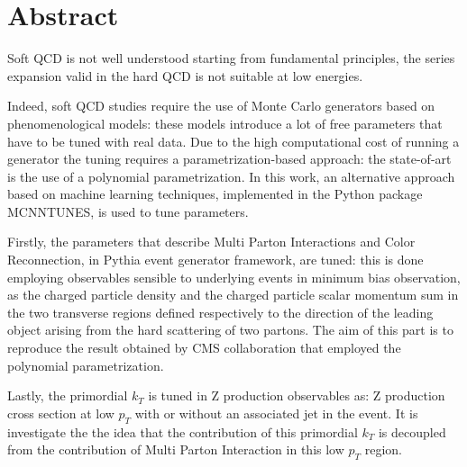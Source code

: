 \documentclass[12pt,a4paper]{article}
\begin{document}
\section*{Abstract}

Soft QCD is not well understood starting from fundamental principles, the series expansion valid in the hard QCD is not suitable at low energies.

Indeed, soft QCD studies require the use of Monte Carlo generators based on phenomenological models: these models introduce a lot of free parameters that have to be tuned with real data.
Due to the high computational cost of running a generator the tuning requires a parametrization-based approach: the state-of-art is the use of a polynomial parametrization. 
In this work, an alternative approach based on machine learning techniques, implemented in the Python package MCNNTUNES, is used to tune parameters. 

Firstly, the parameters that describe Multi Parton Interactions and Color Reconnection, in Pythia event generator framework, are tuned: this is done employing observables sensible to  underlying events in minimum bias observation, as the charged particle density and the charged particle scalar momentum sum in the two transverse regions defined respectively to the direction of the leading object arising from the hard scattering of two partons. 
The aim of this part is to reproduce the result obtained by CMS collaboration that employed the polynomial parametrization. 

Lastly, the primordial $k_T$ is tuned in Z production observables as: Z production cross section at low $p_T$ with or without an associated jet in the event. It is investigate the the idea that the contribution of this primordial $k_T$ is decoupled from the contribution of Multi Parton Interaction in this low $p_T$ region.
\end{document}
